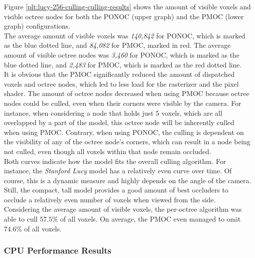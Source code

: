 
\noindent
Figure \ref{plt:lucy-256-culling-culling-results} shows the amount of visible voxels and visible octree 
nodes for both the \ac{PONOC} (upper graph) and the \ac{PMOC} (lower graph) configurations. \\

The average amount of visible voxels was \emph{140,842} for \ac{PONOC}, which is marked 
as the blue dotted line, and \emph{84,082} for \ac{PMOC}, marked in red. The average 
amount of visible octree nodes was \emph{3,460} for \ac{PONOC}, which is marked as the 
blue dotted line, and \emph{2,483} for \ac{PMOC}, which is marked as the red dotted 
line. \\

It is obvious that the \ac{PMOC} significantly reduced the amount of dispatched voxels and octree nodes, 
which led to less load for the rasterizer and the pixel shader. The amount of octree nodes decreased when using 
\ac{PMOC} because octree nodes could be culled, even when their corners were visible by the camera. 
For instance, when considering a node that holds just 5 voxels, which are all overlapped by a part of the model, 
this octree node will be inherently culled when using \ac{PMOC}. Contrary, when using \ac{PONOC}, 
the culling is dependent on the visibility of any of the octree node's corners, which can result in a node being not 
culled, even though all voxels within that node remain occluded. \\

\noindent 
Both curves indicate how the model fits the overall culling algorithm. For instance, the \emph{Stanford Lucy} 
model has a relatively even curve over time. Of course, this is a dynamic measure and highly depends on the 
angle of the camera. Still, the compact, tall model provides a good amount of best occluders to occlude a 
relatively even number of voxels when viewed from the side. \\

\noindent
Considering the average amount of visible voxels, the per-octree algorithm was able to cull $57.5\%$ of all 
voxels. On average, the \ac{PMOC} even managed to omit $74.6\%$ of all voxels. 

\subsubsection*{CPU Performance Results} \label{subsubsec-cpu-performance-results-lucy}

